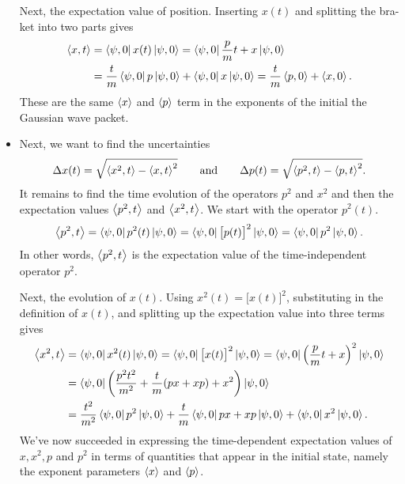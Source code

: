 \documentclass[11pt, a4paper]{article}
\newcommand{\eqtext}[1]{\qquad \text{#1} \qquad}
\begin{document}
\begin{itemize}
	Next, the expectation value of position. Inserting $ x(t) $  and splitting the bra-ket into two parts gives
	\begin{align*}
		\ev{x, t} &= \bra{\psi, 0} x(t) \ket{\psi, 0} = \bra{\psi, 0} \frac{p}{m}t + x \ket{\psi, 0} \\
		&= \frac{t}{m}\bra{\psi, 0} p \ket{\psi, 0} + \bra{\psi, 0} x \ket{\psi, 0} = \frac{t}{m}\ev{p, 0} + \ev{x, 0}.
	\end{align*}
	These are the same  $ \ev{x} $ and $ \ev{p} $ term in the exponents of the initial the Gaussian wave packet. 
	
	\item Next, we want to find the uncertainties
	\begin{equation*}
		\Delta x(t) = \sqrt{\ev{x^{2}, t} - \ev{x, t}^{2}} \eqtext{and} \Delta p(t) = \sqrt{\ev{p^{2}, t} - \ev{p, t}^{2}}.
	\end{equation*}
	It remains to find the time evolution of the operators $ p^{2} $ and $ x^{2} $ and then the expectation values $ \ev{p^{2}, t} $ and $ \ev{x^{2}, t} $. We start with the operator $ p^{2}(t) $. 
	\begin{equation*}
		\ev{p^{2}, t} = \bra{\psi, 0} p^{2}(t) \ket{\psi, 0} = \bra{\psi, 0} \big[p(t)\big]^{2} \ket{\psi, 0} = \bra{\psi, 0} p^{2} \ket{\psi, 0}.
	\end{equation*}
	In other words, $ \ev{p^{2}, t} $ is the expectation value of the time-independent operator $ p^{2} $. 
	
	Next, the evolution of $ x(t) $. Using $ x^{2}(t) = \big[x(t)\big]^{2} $, substituting in the definition of $ x(t) $, and splitting up the expectation value into three terms gives
	\begin{align*}
		\ev{x^{2}, t} &= \bra{\psi, 0} x^{2}(t) \ket{\psi, 0} =  \bra{\psi, 0} \big[x(t)\big]^{2} \ket{\psi, 0} = \bra{\psi, 0}\left(\frac{p}{m}t + x\right)^{2} \ket{\psi, 0}\\
		&= \bra{\psi, 0}\left(\frac{p^{2}t^{2}}{m^{2}} + \frac{t}{m}(px + xp) + x^{2}\right)\ket{\psi, 0}\\
		&= \frac{t^{2}}{m^{2}}\bra{\psi, 0} p^{2} \ket{\psi, 0} + \frac{t}{m}\bra{\psi, 0} px + xp \ket{\psi, 0} + \bra{\psi, 0} x^{2} \ket{\psi, 0}.
	\end{align*}
	We've now succeeded in expressing the time-dependent expectation values of $ x, x^{2}, p $ and $ p^{2} $ in terms of quantities that appear in the initial state, namely the exponent parameters $ \ev{x} $ and $ \ev{p} $. 
	

\end{itemize}
\end{document}
